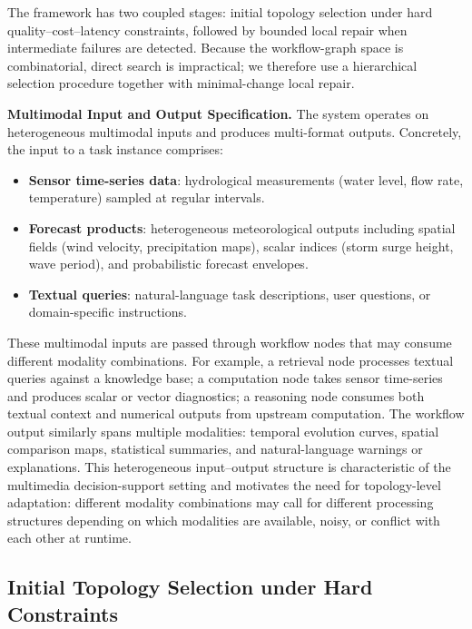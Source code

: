 \documentclass[manuscript,review,anonymous]{acmart}
\begin{document}
The framework has two coupled stages: initial topology selection under hard quality--cost--latency constraints, followed by bounded local repair when intermediate failures are detected. Because the workflow-graph space is combinatorial, direct search is impractical; we therefore use a hierarchical selection procedure together with minimal-change local repair.

\medskip
\noindent\textbf{Multimodal Input and Output Specification.}
The system operates on heterogeneous multimodal inputs and produces multi-format outputs. Concretely, the input to a task instance comprises:

\begin{itemize}
    \item \textbf{Sensor time-series data}: hydrological measurements (water level, flow rate, temperature) sampled at regular intervals.
    \item \textbf{Forecast products}: heterogeneous meteorological outputs including spatial fields (wind velocity, precipitation maps), scalar indices (storm surge height, wave period), and probabilistic forecast envelopes.
    \item \textbf{Textual queries}: natural-language task descriptions, user questions, or domain-specific instructions.
\end{itemize}

These multimodal inputs are passed through workflow nodes that may consume different modality combinations. For example, a retrieval node processes textual queries against a knowledge base; a computation node takes sensor time-series and produces scalar or vector diagnostics; a reasoning node consumes both textual context and numerical outputs from upstream computation. The workflow output similarly spans multiple modalities: temporal evolution curves, spatial comparison maps, statistical summaries, and natural-language warnings or explanations. This heterogeneous input--output structure is characteristic of the multimedia decision-support setting and motivates the need for topology-level adaptation: different modality combinations may call for different processing structures depending on which modalities are available, noisy, or conflict with each other at runtime.

\subsection{Initial Topology Selection under Hard Constraints}
\label{sec:init_objective}
\end{document}
